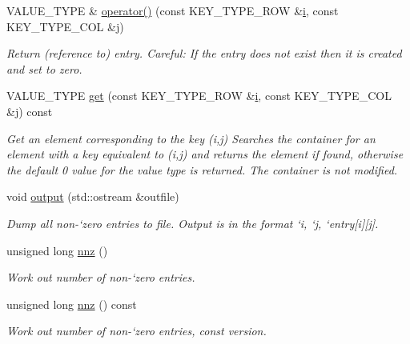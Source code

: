 \begin{DoxyCompactItemize}
V\+A\+L\+U\+E\+\_\+\+T\+Y\+PE \& \hyperlink{classoomph_1_1MapMatrixMixed_ad348711a05b2266ccd0fa80b82992610}{operator()} (const K\+E\+Y\+\_\+\+T\+Y\+P\+E\+\_\+\+R\+OW \&\hyperlink{cfortran_8h_adb50e893b86b3e55e751a42eab3cba82}{i}, const K\+E\+Y\+\_\+\+T\+Y\+P\+E\+\_\+\+C\+OL \&j)
\begin{DoxyCompactList}\small\item\em Return (reference to) entry. Careful\+: If the entry does not exist then it is created and set to zero. \end{DoxyCompactList}\item 
V\+A\+L\+U\+E\+\_\+\+T\+Y\+PE \hyperlink{classoomph_1_1MapMatrixMixed_aee00d676e6d7833a9b2399bf919bb58a}{get} (const K\+E\+Y\+\_\+\+T\+Y\+P\+E\+\_\+\+R\+OW \&\hyperlink{cfortran_8h_adb50e893b86b3e55e751a42eab3cba82}{i}, const K\+E\+Y\+\_\+\+T\+Y\+P\+E\+\_\+\+C\+OL \&j) const
\begin{DoxyCompactList}\small\item\em Get an element corresponding to the key (i,j) Searches the container for an element with a key equivalent to (i,j) and returns the element if found, otherwise the default 0 value for the value type is returned. The container is not modified. \end{DoxyCompactList}\item 
void \hyperlink{classoomph_1_1MapMatrixMixed_aa250e1584c330b589b2153dd5e170d31}{output} (std\+::ostream \&outfile)
\begin{DoxyCompactList}\small\item\em Dump all non-\/`zero\textquotesingle{} entries to file. Output is in the format `i\textquotesingle{}, `j\textquotesingle{}, `entry\mbox{[}i\mbox{]}\mbox{[}j\mbox{]}\textquotesingle{}. \end{DoxyCompactList}\item 
unsigned long \hyperlink{classoomph_1_1MapMatrixMixed_a24bcb7415eaecc66e0649122ba748e5c}{nnz} ()
\begin{DoxyCompactList}\small\item\em Work out number of non-\/`zero\textquotesingle{} entries. \end{DoxyCompactList}\item 
unsigned long \hyperlink{classoomph_1_1MapMatrixMixed_a578320f7979e3f69578e8fb8a42c3ee6}{nnz} () const
\begin{DoxyCompactList}\small\item\em Work out number of non-\/`zero\textquotesingle{} entries, const version. \end{DoxyCompactList}\item 

\end{DoxyCompactItemize}

